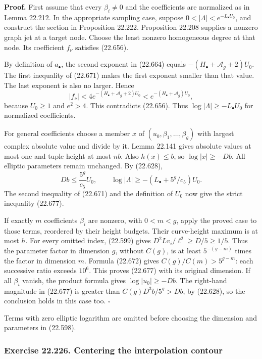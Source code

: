 \documentclass[
  11pt,
  a4paper,
]{article}
\begin{document}
\textbf{Proof.} First assume that every \(\beta_i\ne0\) and the
coefficients are normalized as in Lemma 22.212. In the appropriate
sampling case, suppose \(0<|\Lambda|<e^{-L_\bullet U_0}\), and construct
the section in Proposition 22.222. Proposition 22.208 supplies a nonzero
graph jet at a target node. Choose the least nonzero homogeneous degree
at that node. Its coefficient \(f_\nu\) satisfies (22.656).

By definition of \(a_\bullet\), the second exponent in (22.664) equals
\(-(H_\bullet+\mathcal A_g+2)U_0\). The first inequality of (22.671)
makes the first exponent smaller than that value. The last exponent is
also no larger. Hence \[
 |f_\nu|<4e^{-(H_\bullet+\mathcal A_g+2)U_0}
              <e^{-(H_\bullet+\mathcal A_g)U_0},
 \tag{22.678}
\] because \(U_0\ge1\) and \(e^2>4\). This contradicts (22.656). Thus
\(\log|\Lambda|\ge-L_\bullet U_0\) for normalized coefficients.

For general coefficients choose a member \(x\) of
\((u_0,\beta_1,\ldots,\beta_g)\) with largest complex absolute value and
divide by it. Lemma 22.141 gives absolute values at most one and tuple
height at most \(nb\). Also \(h(x)\le b\), so \(\log|x|\ge-Db\). All
elliptic parameters remain unchanged. By (22.628), \[
 Db\le\frac{5^g}{c_5}U_0,
 \qquad
 \log|\Lambda|\ge-(L_\bullet+5^g/c_5)U_0.
 \tag{22.679}
\] The second inequality of (22.671) and the definition of \(U_0\) now
give the strict inequality (22.677).

If exactly \(m\) coefficients \(\beta_i\) are nonzero, with \(0<m<g\),
apply the proved case to those terms, reordered by their height budgets.
Their curve-height maximum is at most \(h\). For every omitted index,
(22.599) gives \(D^2Lv_i/\ell^2\ge D/5\ge1/5\). Thus the parameter
factor in dimension \(g\), without \(C(g)\), is at least \(5^{-(g-m)}\)
times the factor in dimension \(m\). Formula (22.672) gives
\(C(g)/C(m)>5^{g-m}\): each successive ratio exceeds \(10^6\). This
proves (22.677) with its original dimension. If all \(\beta_i\) vanish,
the product formula gives \(\log|u_0|\ge-Db\). The right-hand magnitude
in (22.677) is greater than \(C(g)D^3b/5^g>Db\), by (22.628), so the
conclusion holds in this case too. \(\square\)

Terms with zero elliptic logarithm are omitted before choosing the
dimension and parameters in (22.598).

\subsubsection{Exercise 22.226. Centering the interpolation
contour}\label{exercise-22.226.-centering-the-interpolation-contour}
\end{document}
